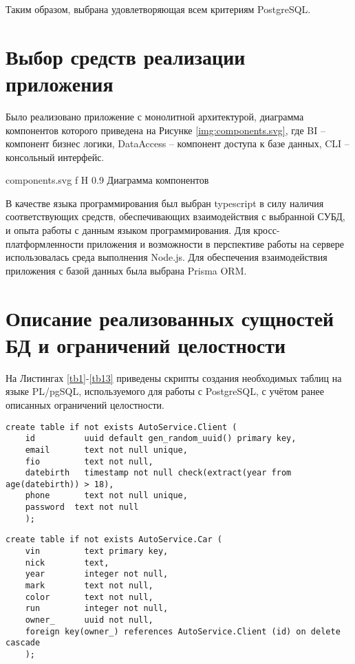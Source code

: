 Таким образом, выбрана удовлетворяющая всем критериям PostgreSQL.

\section{Выбор средств реализации приложения}

Было реализовано приложение с монолитной архитектурой, диаграмма компонентов которого приведена на Рисунке \ref{img:components.svg}, где BI -- компонент бизнес логики, DataAccess -- компонент доступа к базе данных, CLI -- консольный интерфейс.

\myincludesvg
{components.svg} 
{f} 
{H} 
{0.9\textwidth} 
{Диаграмма компонентов}

В качестве языка программирования был выбран typescript\cite{typescript} в силу наличия соответствующих средств, обеспечивающих взаимодействия с выбранной СУБД, и опыта работы с данным языком программирования. 
Для кросс-платформленности приложения и возможности в перспективе работы на сервере использовалась среда выполнения Node.js\cite{nodejs}. 
Для обеспечения взаимодействия приложения с базой данных была выбрана Prisma ORM\cite{prismaorm}.

\section{Описание реализованных сущностей БД и ограничений целостности}

На Листингах \ref{tb1}-\ref{tb13} приведены скрипты создания необходимых таблиц на языке PL/pgSQL\cite{plpgsql}, используемого для работы с PostgreSQL, с учётом ранее описанных ограничений целостности.

\begin{lstlisting}[label=tb1, style=mystyle, caption=Создание таблицы Client и соотвествующих ограничений целостности]
	create table if not exists AutoService.Client (
	id			uuid default gen_random_uuid() primary key,
	email       text not null unique,
	fio         text not null,
	datebirth   timestamp not null check(extract(year from age(datebirth)) > 18),
	phone       text not null unique,
	password  text not null
	);
\end{lstlisting}

\begin{lstlisting}[label=tb2, style=mystyle, caption=Создание таблицы Car и соотвествующих ограничений целостности]
	create table if not exists AutoService.Car (
	vin			text primary key,
	nick       	text,
	year        integer not null,
	mark	   	text not null,
	color       text not null,
	run  		integer not null,
	owner_		uuid not null,
	foreign key(owner_) references AutoService.Client (id) on delete cascade
	);
\end{lstlisting}

